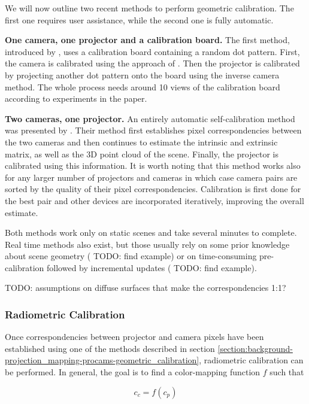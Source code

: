 We will now outline two recent methods to perform geometric calibration. The first one requires user assistance, while the second one is fully automatic.

\textbf{One camera, one projector and a calibration board.} The first method, introduced by \citet{Yang2016}, uses a calibration board containing a random dot pattern. First, the camera is calibrated using the approach of \citet{Zhang1999}. Then the projector is calibrated by projecting another dot pattern onto the board using the inverse camera method. The whole process needs around 10 views of the calibration board according to experiments in the paper.

\textbf{Two cameras, one projector.} An entirely automatic self-calibration method was presented by \citet{Willi2017}. Their method first establishes pixel correspondencies between the two cameras and then continues to estimate the intrinsic and extrinsic matrix, as well as the 3D point cloud of the scene. Finally, the projector is calibrated using this information. It is worth noting that this method works also for any larger number of projectors and cameras in which case camera pairs are sorted by the quality of their pixel correspondencies. Calibration is first done for the best pair and other devices are incorporated iteratively, improving the overall estimate.

Both methods work only on static scenes and take several minutes to complete. Real time methods also exist, but those usually rely on some prior knowledge about scene geometry ({\color{red} TODO: find example}) or on time-consuming pre-calibration followed by incremental updates ({\color{red} TODO: find example}).

{\color{red} TODO: assumptions on diffuse surfaces that make the correspondencies 1:1?}

\subsubsection{Radiometric Calibration}
\label{section:background-projection_mapping-procams-radiometric_calibration}

Once correspondencies between projector and camera pixels have been established using one of the methods described in section \ref{section:background-projection_mapping-procams-geometric_calibration}, radiometric calibration can be performed. In general, the goal is to find a color-mapping function \(f\) such that

\begin{equation}
    \label{eq:radiometric_calibration}
    c_c = f(c_p)
\end{equation}

